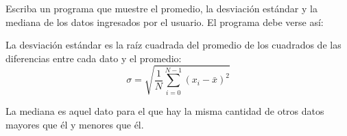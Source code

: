 Escriba un programa que muestre el promedio,
la desviación estándar y la mediana
de los datos ingresados por el usuario.
El programa debe verse así:

\begin{minipage}[t]{.60\textwidth}
  
\end{minipage}

La desviación estándar es la raíz cuadrada
del promedio de los cuadrados
de las diferencias entre cada dato y el promedio:
\[
  \sigma = \sqrt{
    \frac{1}{N} \sum_{i=0}^{N - 1}(x_i - \bar x)^2
  }
\]

La mediana es aquel dato para el que hay
la misma cantidad de otros datos mayores que él
y menores que él.
